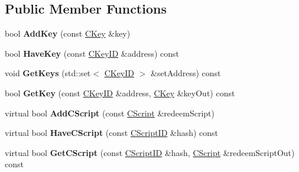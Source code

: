 \subsection*{Public Member Functions}
\begin{DoxyCompactItemize}
\item 
\mbox{\label{class_c_basic_key_store_a07950fc7f9bba7f2460d89a882ac544b}} 
bool {\bfseries Add\+Key} (const \mbox{\hyperlink{class_c_key}{C\+Key}} \&key)
\item 
\mbox{\label{class_c_basic_key_store_afc99762e3e58f93e198d85ecfdf5804a}} 
bool {\bfseries Have\+Key} (const \mbox{\hyperlink{class_c_key_i_d}{C\+Key\+ID}} \&address) const
\item 
\mbox{\label{class_c_basic_key_store_a41f3895021dae008582ceb55a98b0891}} 
void {\bfseries Get\+Keys} (std\+::set$<$ \mbox{\hyperlink{class_c_key_i_d}{C\+Key\+ID}} $>$ \&set\+Address) const
\item 
\mbox{\label{class_c_basic_key_store_a69328ee642e4234922356f59876e956d}} 
bool {\bfseries Get\+Key} (const \mbox{\hyperlink{class_c_key_i_d}{C\+Key\+ID}} \&address, \mbox{\hyperlink{class_c_key}{C\+Key}} \&key\+Out) const
\item 
\mbox{\label{class_c_basic_key_store_a56249ce3540398999cd397eeb662e836}} 
virtual bool {\bfseries Add\+C\+Script} (const \mbox{\hyperlink{class_c_script}{C\+Script}} \&redeem\+Script)
\item 
\mbox{\label{class_c_basic_key_store_a499e0a1d117b43e3200883d88a400bf6}} 
virtual bool {\bfseries Have\+C\+Script} (const \mbox{\hyperlink{class_c_script_i_d}{C\+Script\+ID}} \&hash) const
\item 
\mbox{\label{class_c_basic_key_store_a975abe0f2efa3e0e2270d3714d73010a}} 
virtual bool {\bfseries Get\+C\+Script} (const \mbox{\hyperlink{class_c_script_i_d}{C\+Script\+ID}} \&hash, \mbox{\hyperlink{class_c_script}{C\+Script}} \&redeem\+Script\+Out) const
\item 
\mbox{\label{class_c_basic_key_store_a2417d0ae4e654c88cf47a1ba5f71b5a3}} 

\end{DoxyCompactItemize}
